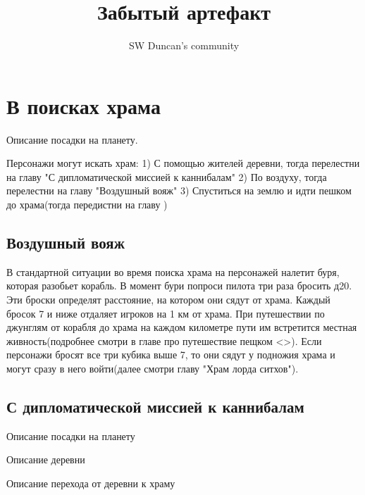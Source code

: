 \documentclass{article}
\title{Забытый артефакт}
\author{SW Duncan's community}
\begin{document}
\pagecolor{sky_black}
\BgThispage
\maketitle %
\newpage
\tableofcontents %
\newpage
\section{В поисках храма}

Описание посадки на планету.
\begin{myquote}
\color{sw}

\end{myquote}
Персонажи могут искать храм:
1) С помощью жителей деревни, тогда перелестни на главу "С дипломатической миссией к каннибалам"
2) По воздуху, тогда перелестни на главу "Воздушный вояж"
3) Спуститься на землю и идти пешком до храма(тогда передистни на главу )
\subsection{Воздушный вояж}
В стандартной ситуации во время поиска храма на персонажей налетит буря, которая разобьет корабль.
В момент бури попроси пилота три раза бросить д20. Эти броски определят расстояние, на котором они сядут от храма.
Каждый бросок 7 и ниже отдаляет игроков на 1 км от храма. При путешествии по джунглям от корабля до храма на каждом километре пути им встретится местная живность(подробнее смотри в главе про путешествие пещком <>). Если персонажи бросят все три кубика выше 7, то они сядут у подножия храма и могут сразу в него войти(далее смотри главу "Храм лорда ситхов").

\begin{myquote}
\color{sw}

\end{myquote}
\subsection{С дипломатической миссией к каннибалам}
Описание посадки на планету
\begin{myquote}
\color{sw}

\end{myquote}
Описание деревни
\begin{myquote}
\color{sw}

\end{myquote}
Описание перехода от деревни к храму
\begin{myquote}
\color{sw}

\end{myquote}
\end{document}
